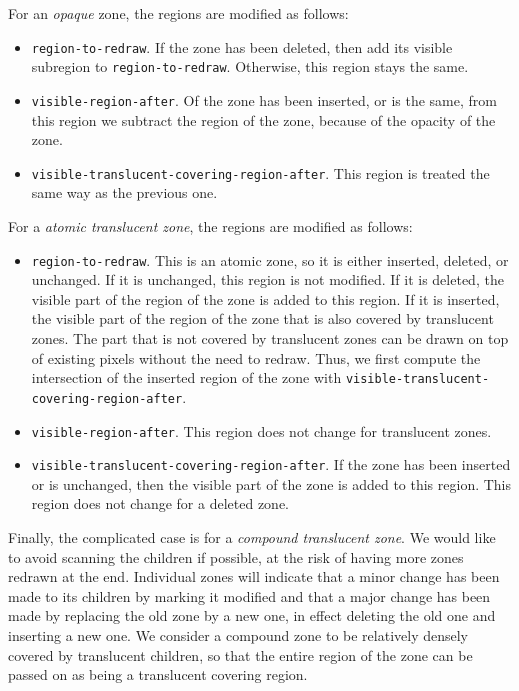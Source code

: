 \documentclass{report}
\begin{document}
For an \emph{opaque} zone, the regions are modified as follows:

\begin{itemize}
\item \texttt{region-to-redraw}.  If the zone has been deleted, then
  add its visible subregion to \texttt{region-to-redraw}.  Otherwise,
  this region stays the same.
\item \texttt{visible-region-after}.  Of the zone has been inserted,
  or is the same, from this region we subtract the region of the
  zone, because of the opacity of the zone.
\item \texttt{visible-translucent-covering-region-after}.  This region
  is treated the same way as the previous one.
\end{itemize}

For a \emph{atomic translucent zone}, the regions are modified as
follows:

\begin{itemize}
\item \texttt{region-to-redraw}.  This is an atomic zone, so it is
  either inserted, deleted, or unchanged.  If it is unchanged,
  this region is not modified.  If it is deleted, the
  visible part of the region of the zone is added to this region.
  If it is inserted, the visible part of the region of the zone that
  is also covered by translucent zones.  The part that is not
  covered by translucent zones can be drawn on top of existing
  pixels without the need to redraw.  Thus,
  we first compute the intersection of the inserted region of the zone
  with \texttt{visible-translucent-covering-region-after}.
\item \texttt{visible-region-after}.  This region does not change for
  translucent zones. 
\item \texttt{visible-translucent-covering-region-after}.  If the
  zone has been inserted or is unchanged, then the visible
  part of the zone is added to this region.  This region does not
  change for a deleted zone.
\end{itemize}

Finally, the complicated case is for a \emph{compound translucent
  zone}.  We would like to avoid scanning the children if possible,
  at the risk of having more zones redrawn at the end.  Individual
  zones will indicate that a minor change has been made to its
  children by marking it modified and that a major change has been
  made by replacing the old zone by a new one, in effect deleting
  the old one and inserting a new one.  We consider a compound zone
  to be relatively densely covered by translucent children, so that
  the entire region of the zone can be passed on as being a
  translucent covering region.
\end{document}
